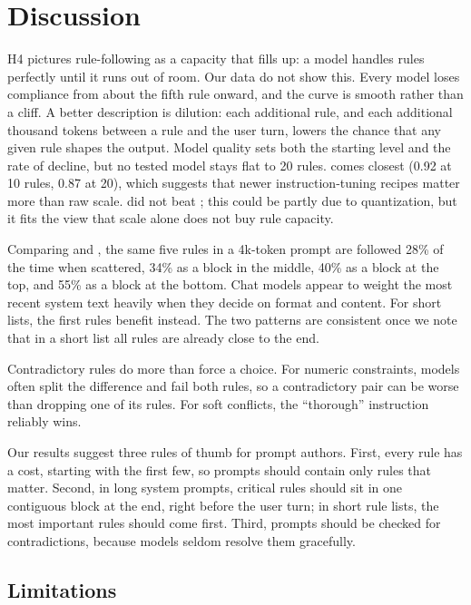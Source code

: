 \section{Discussion}
\label{sec:discussion}

H4 pictures rule-following as a capacity that fills up: a model handles rules perfectly until it runs out of room.
Our data do not show this.
Every model loses compliance from about the fifth rule onward, and the curve is smooth rather than a cliff.
A better description is dilution: each additional rule, and each additional thousand tokens between a rule and the user turn, lowers the chance that any given rule shapes the output.
Model quality sets both the starting level and the rate of decline, but no tested model stays flat to 20 rules.
\qwenthree comes closest (0.92 at 10 rules, 0.87 at 20), which suggests that newer instruction-tuning recipes matter more than raw scale.
\qfourteen did not beat \qseven; this could be partly due to quantization, but it fits the view that scale alone does not buy rule capacity.

Comparing \expB and \expF, the same five rules in a 4k-token prompt are followed 28\% of the time when scattered, 34\% as a block in the middle, 40\% as a block at the top, and 55\% as a block at the bottom.
Chat models appear to weight the most recent system text heavily when they decide on format and content.
For short lists, the first rules benefit instead.
The two patterns are consistent once we note that in a short list all rules are already close to the end.

Contradictory rules do more than force a choice.
For numeric constraints, models often split the difference and fail both rules, so a contradictory pair can be worse than dropping one of its rules.
For soft conflicts, the ``thorough'' instruction reliably wins.

Our results suggest three rules of thumb for prompt authors.
First, every rule has a cost, starting with the first few, so prompts should contain only rules that matter.
Second, in long system prompts, critical rules should sit in one contiguous block at the end, right before the user turn; in short rule lists, the most important rules should come first.
Third, prompts should be checked for contradictions, because models seldom resolve them gracefully.

\subsection{Limitations}
\label{sec:limitations}

